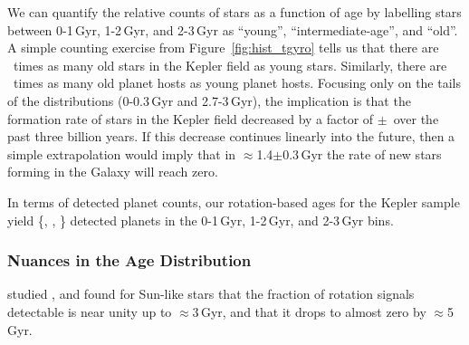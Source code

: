 \documentclass[11pt,twocolumn,tighten]{aastex63}
\begin{document}
We can quantify the relative counts of stars as a function of age by
labelling stars between 0-1\,Gyr, 1-2\,Gyr, and 2-3\,Gyr as ``young'',
``intermediate-age'', and ``old''.  A simple counting exercise from
Figure~\ref{fig:hist_tgyro} tells us that there are
\ratioobtoybstars\ times as many old stars in the Kepler field as young stars.
Similarly, there are \ratioobtoybplanets\ times as many old planet
hosts as young planet hosts.  Focusing only on the tails of the
distributions (0-0.3\,Gyr and 2.7-3\,Gyr), the implication is that the
formation rate of stars in the Kepler field decreased by a factor of
\ratiosfr$\pm$\uncratiosfr\ over the past three billion years.  If
this decrease continues linearly into the future, then a simple
extrapolation would imply that in $\approx$1.4$\pm$0.3\,Gyr the rate
of new stars forming in the Galaxy will reach zero.

In terms of detected planet counts, our rotation-based ages for the
Kepler sample yield \{\nplyounggyro, \nplmidgyro, \nploldgyro\}
detected planets in the 0-1\,Gyr, 1-2\,Gyr, and 2-3\,Gyr bins.  


\subsubsection{Nuances in the Age Distribution}

 \citet{2022ApJ...937...94M}
studied , and found for Sun-like
stars that the fraction of rotation signals detectable is near unity up to $\approx$3\,Gyr,
and that it drops to almost zero by $\approx$5\,Gyr.  

\end{document}
